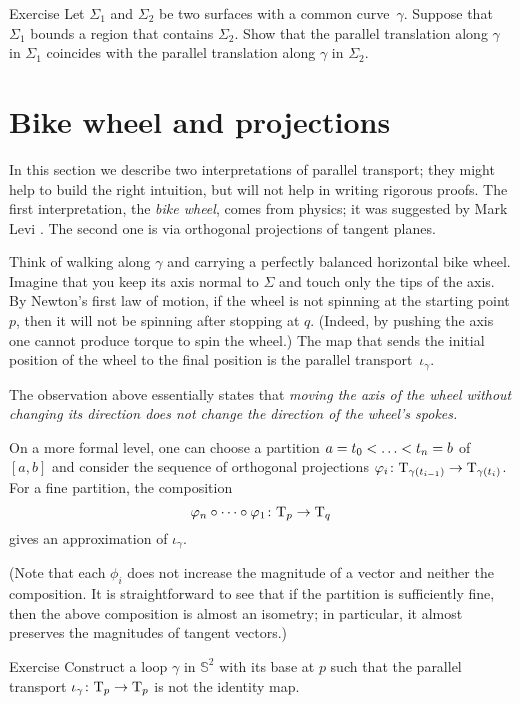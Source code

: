 \begin{thm}{Exercise}\label{ex:parallel-transport-support}
Let $\Sigma_1$ and $\Sigma_2$ be two surfaces with a common curve~$\gamma$.
Suppose that $\Sigma_1$ bounds a region that contains $\Sigma_2$.
Show that the parallel translation along $\gamma$ in $\Sigma_1$ 
coincides with the parallel translation along $\gamma$ in $\Sigma_2$. 
\end{thm}

\section{Bike wheel and projections}

In this section we describe two interpretations of parallel transport;
they might help to build the right intuition, but will not help in writing rigorous proofs.
The first interpretation, the {}\emph{bike wheel}, comes from physics; it was suggested by Mark Levi \cite{levi}.
The second one is via orthogonal projections of tangent planes.

Think of walking along $\gamma$ and carrying a perfectly balanced horizontal bike wheel.
Imagine that you keep its axis normal to $\Sigma$ and touch only the tips of the axis.
By Newton's first law of motion, if the wheel is not spinning at the starting point $p$, then it will not be spinning after stopping at $q$.
(Indeed, by pushing the axis one cannot produce torque to spin the wheel.)
The map that sends the initial position of the wheel to the final position is  the parallel transport~$\iota_\gamma$.

The observation above essentially states that {}\emph{moving the axis of the wheel without changing its direction does not change the direction of the wheel's spokes.}

On a more formal level, one can choose a partition $a=t_0<\dots\z<t_n=b$ of $[a,b]$
and consider the sequence of orthogonal projections $\varphi_i\colon\mathrm{T}_{\gamma(t_{i-1})}\to\mathrm{T}_{\gamma(t_i)}$.
For a fine partition, the composition 
\[\phi_n\circ\dots\circ\phi_1\:\T_p\z\to\T_q\]
gives an approximation of $\iota_\gamma$.

(Note that each $\phi_i$ does not increase the magnitude of a vector and neither the composition.
It is straightforward to see that if the partition is sufficiently fine, then the above composition is almost an isometry; in particular, it almost preserves the magnitudes of tangent vectors.)

\begin{thm}{Exercise}\label{ex:holonomy=not0}
Construct a loop $\gamma$ in $\mathbb{S}^2$ with its base at $p$ such that the parallel transport $\iota_\gamma\colon\mathrm{T}_p\to\mathrm{T}_p$ is not the identity map.
\end{thm}

